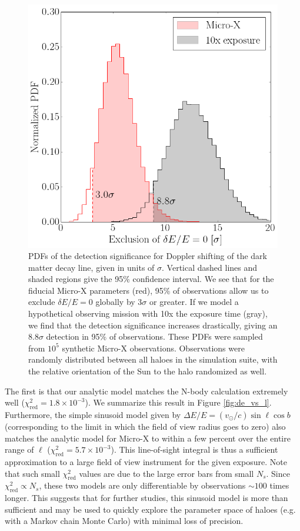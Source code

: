 \documentclass[aps,prd,10pt,twocolumn,superscriptaddress,showpacs]{revtex4-1}
\begin{document}
\begin{figure}[h!]
\centering
\includegraphics[width=1.0\columnwidth]{sig_pdf.png}
\caption{ 
	PDFs of the detection significance for Doppler shifting of the dark matter decay line, given in
	units of $\sigma$. Vertical dashed lines and shaded regions give the 95\% confidence interval.
	We see that for the fiducial Micro-X parameters (red), 95\% of observations allow us to exclude
	$\delta E/E=0$ globally by $3\sigma$ or greater. If we model a hypothetical observing mission with
	10x the exposure time (gray), we find that the detection significance increases drastically, giving an
	$8.8\sigma$ detection in 95\% of observations. 
	These PDFs were sampled from $10^5$ synthetic Micro-X observations. Observations were randomly distributed
	between all haloes in the simulation suite, with the relative orientation of the Sun to the halo
	randomized as well. 
}
\label{fig:sigma_pdf}
\end{figure}


The first is that our analytic model matches the N-body calculation
extremely well ($\chi^2_\mathrm{red}=1.8\times 10^{-3}$).  We summarize this result in Figure
\ref{fig:de_vs_l}. Furthermore, the simple sinusoid model given by $\Delta E/E
= (v_\odot/c) \sin \ell \cos b$ (corresponding to the limit in which the field of view radius goes to
zero) also matches the analytic model for Micro-X to within a few percent over the entire range of
$\ell$ ($\chi^2_\mathrm{red}=5.7\times 10^{-3}$). This line-of-sight integral is thus
a sufficient approximation to a large field of view instrument for the given exposure. 
Note that such small $\chi^2_\mathrm{red}$ values are due to the large error bars from small $N_s$.
Since $\chi^2_\mathrm{red} \propto N_s$, these two models are 
only differentiable by observations $\sim 100$ times longer.  
This suggests that for further studies, this sinusoid model is more than sufficient and may be
used to quickly explore the parameter space of haloes (e.g. with a Markov chain Monte Carlo) with minimal loss of precision.
\end{document}
